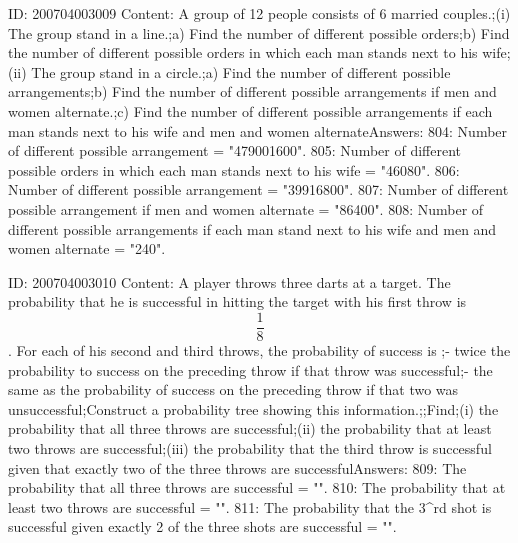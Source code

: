 \documentclass{article}
\begin{document}
ID: 200704003009
Content:
A group of 12 people consists of 6 married couples.;(i) The group stand in a line.;a) Find the number of different possible orders;b) Find the number of different possible orders in which each man stands next to his wife;(ii) The group stand in a circle.;a) Find the number of different possible arrangements;b) Find the number of different possible arrangements if men and women alternate.;c) Find the number of different possible arrangements if each man stands next to his wife and men and women alternateAnswers:
804: Number of different possible arrangement = "479001600".
805: Number of different possible orders in which each man stands next to his wife = "46080".
806: Number of different possible arrangement = "39916800".
807: Number of different possible arrangement if men and women alternate = "86400".
808: Number of different possible arrangements if each man stand next to his wife and men and women alternate = "240".

ID: 200704003010
Content:
A player throws three darts at a target. The probability that he is successful in hitting the target with his first throw is $$\frac{1}{8}$$. For each of his second and third throws, the probability of success is ;- twice the probability to success on the preceding throw if that throw was successful;- the same as the probability of success on the preceding throw if that two was unsuccessful;Construct a probability tree showing this information.;;Find;(i) the probability that all three throws are successful;(ii) the probability that at least two throws are successful;(iii) the probability that the third throw is successful given that exactly two of the three throws are successfulAnswers:
809: The probability that all three throws are successful = "".
810: The probability that at least two throws are successful = "".
811: The probability that the 3^{rd} shot is successful given exactly 2 of the three shots are successful = "".
\end{document}
